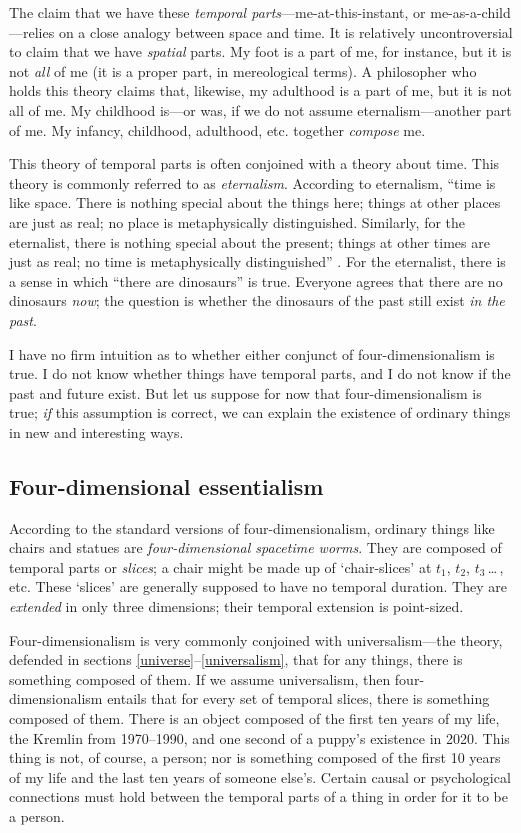 \documentclass[11pt]{article}
\begin{document}
\begin{spacing}{1.5}
The claim that we have these {\em temporal
  parts}---me-at-this-instant, or me-as-a-child---relies on a close
analogy between space and time.  It is relatively uncontroversial to
claim that we have {\em spatial} parts.  My foot is a part of me, for
instance, but it is not {\em all} of me (it is a proper part, in
mereological terms).  A philosopher who holds this theory claims that,
likewise, my adulthood is a part of me, but it is not all of me.  My
childhood is---or was, if we do not assume eternalism---another part
of me.  My infancy, childhood, adulthood, etc. together {\em compose}
me.

This theory of temporal parts is often conjoined with a theory about
time.  This theory is commonly referred to as {\em eternalism}.
According to eternalism, ``time is like space.  There is nothing
special about the things here; things at other places are just as
real; no place is metaphysically distinguished.  Similarly, for the
eternalist, there is nothing special about the present; things at
other times are just as real; no time is metaphysically
distinguished'' \citep[122]{hinchliff1996}.  For the eternalist, there
is a sense in which ``there are dinosaurs'' is true.  Everyone agrees
that there are no dinosaurs {\em now}; the question is whether the
dinosaurs of the past still exist {\em in the past}.  

I have no firm intuition as to whether either conjunct of
four-dimensionalism is true.  I do not know whether things have
temporal parts, and I do not know if the past and future exist.  But
let us suppose for now that four-dimensionalism is true; {\em if} this
assumption is correct, we can explain the existence of ordinary things
in new and interesting ways.

\subsection{Four-dimensional essentialism}
\label{4de}
According to the standard versions of four-dimensionalism, ordinary
things like chairs and statues are {\em four-dimensional spacetime
  worms}.  They are composed of temporal parts or {\em slices}; a
chair might be made up of `chair-slices' at $t_{1}$, $t_{2}$,
$t_{3}$\,\ldots\,, etc.  These `slices' are generally supposed to have
no temporal duration.  They are {\em extended} in only three
dimensions; their temporal extension is point-sized.

Four-dimensionalism is very commonly conjoined with universalism---the
theory, defended in sections \ref{universe}--\ref{universalism}, that
for any things, there is something composed of them.  If we assume
universalism, then four-dimensionalism entails that for every set of
temporal slices, there is something composed of them.  There is an
object composed of the first ten years of my life, the Kremlin from
1970--1990, and one second of a puppy's existence in 2020.  This thing
is not, of course, a person; nor is something composed of the first 10
years of my life and the last ten years of someone else's.  Certain
causal or psychological connections must hold between the temporal
parts of a thing in order for it to be a person.


\end{spacing}
\end{document}
